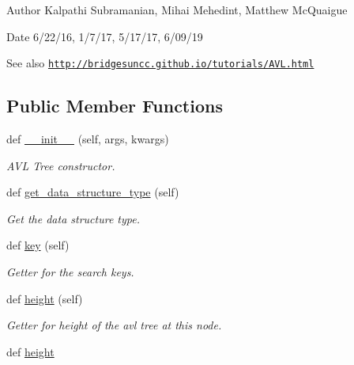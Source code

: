 \begin{DoxyAuthor}{Author}
Kalpathi Subramanian, Mihai Mehedint, Matthew Mc\+Quaigue
\end{DoxyAuthor}
\begin{DoxyDate}{Date}
6/22/16, 1/7/17, 5/17/17, 6/09/19
\end{DoxyDate}
\begin{DoxySeeAlso}{See also}
\href{http://bridgesuncc.github.io/tutorials/AVL.html}{\tt http\+://bridgesuncc.\+github.\+io/tutorials/\+A\+V\+L.\+html} 
\end{DoxySeeAlso}
\subsection*{Public Member Functions}
\begin{DoxyCompactItemize}
\item 
def \hyperlink{classbridges_1_1avl__tree__element_1_1_a_v_l_tree_element_a1b3255d91449ada8e7347bd78f166d84}{\+\_\+\+\_\+init\+\_\+\+\_\+} (self, args, kwargs)
\begin{DoxyCompactList}\small\item\em A\+VL Tree constructor. \end{DoxyCompactList}\item 
def \hyperlink{classbridges_1_1avl__tree__element_1_1_a_v_l_tree_element_a550eaee1c1de211c69a2cfc6d89544fe}{get\+\_\+data\+\_\+structure\+\_\+type} (self)
\begin{DoxyCompactList}\small\item\em Get the data structure type. \end{DoxyCompactList}\item 
def \hyperlink{classbridges_1_1avl__tree__element_1_1_a_v_l_tree_element_aa98417f116a2fa96bb4fd57a009a8517}{key} (self)
\begin{DoxyCompactList}\small\item\em Getter for the search keys. \end{DoxyCompactList}\item 
def \hyperlink{classbridges_1_1avl__tree__element_1_1_a_v_l_tree_element_ac262e026e103fc407f585dfc4dcfab9f}{height} (self)
\begin{DoxyCompactList}\small\item\em Getter for height of the avl tree at this node. \end{DoxyCompactList}\item 
def \hyperlink{classbridges_1_1avl__tree__element_1_1_a_v_l_tree_element_a0ee04b3b15bbb37562e15fd882f1b0cd}{height}

\end{DoxyCompactItemize}
